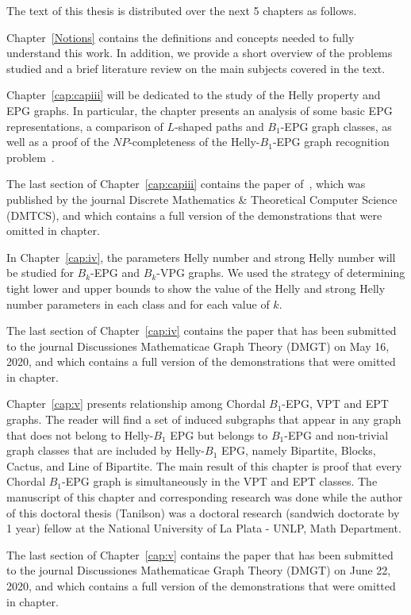 The text of this thesis is distributed over the next 5 chapters as follows.


Chapter~\ref{Notions} contains the definitions and concepts needed to fully understand this work.  In addition, we provide a short overview of the problems studied and a brief literature review on the main subjects covered in the text.

Chapter~\ref{cap:capiii} will be dedicated to the study of the Helly property and EPG graphs. In particular, the chapter presents an analysis of some basic EPG representations, a comparison of $L$-shaped paths and $B_1$-EPG graph classes, as well as a proof of the $NP$-completeness of the Helly-$B_1$-EPG  graph recognition problem~\cite{dmtcs:6506}. 

The last section of Chapter~\ref{cap:capiii} contains  the paper of~\citet{dmtcs:6506}, which was published by the journal Discrete Mathematics \& Theoretical Computer Science (DMTCS), and which contains a full version of the demonstrations that were omitted in chapter.


In Chapter~\ref{cap:iv}, the parameters Helly number and strong Helly number will be studied for  $ B_k$-EPG and $ B_k$-VPG graphs. We used the strategy of determining tight lower and upper bounds to show the value of the Helly and strong Helly number parameters in each class and for each value of $k$. 

The last section of Chapter~\ref{cap:iv} contains the paper that has been submitted to the  journal Discussiones Mathematicae Graph Theory (DMGT) on May 16, 2020, and which contains a full version of the demonstrations that were omitted in chapter.


Chapter~\ref{cap:v} presents relationship among Chordal $B_1$-EPG, VPT and EPT graphs. The reader will find a set of induced subgraphs that appear in any graph that does not belong to Helly-$B_1$ EPG but belongs to $B_1$-EPG and non-trivial graph classes that are included by Helly-$B_1$ EPG, namely Bipartite, Blocks, Cactus, and Line of Bipartite. The main result of this chapter is proof that every Chordal $B_1$-EPG graph is simultaneously in the VPT and EPT classes.  The manuscript of this chapter and corresponding research was done while the author of this doctoral thesis (Tanilson) was a doctoral research (sandwich doctorate by 1 year) fellow at the National University of La Plata - UNLP, Math Department. 
 
The last section of Chapter~\ref{cap:v} contains the paper that has been submitted to the  journal Discussiones Mathematicae Graph Theory (DMGT) on June 22, 2020, and which contains a full version of the demonstrations that were omitted in chapter.


